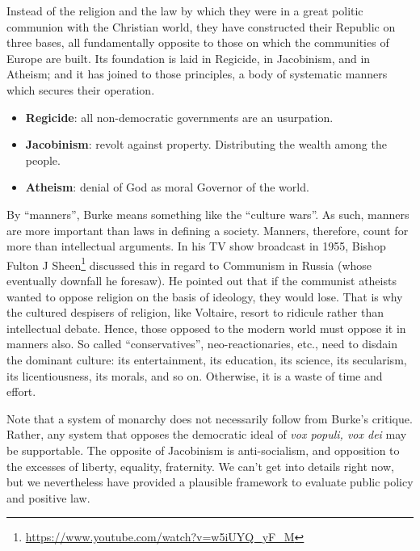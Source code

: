 \begin{quotex}
Instead of the religion and the law by which they were in a great politic communion with the Christian world, they have constructed their Republic on three bases, all fundamentally opposite to those on which the communities of Europe are built. Its foundation is laid in Regicide, in Jacobinism, and in Atheism; and it has joined to those principles, a body of systematic manners which secures their operation.
\end{quotex}


\begin{itemize}


\item \textbf{Regicide}: all non-democratic governments are an usurpation.

\item \textbf{Jacobinism}: revolt against property. Distributing the wealth among the people.

\item \textbf{Atheism}: denial of God as moral Governor of the world.

\end{itemize}


By ``manners'', Burke means something like the ``culture wars''. As such, manners are more important than laws in defining a society. Manners, therefore, count for more than intellectual arguments. In his TV show broadcast in 1955, Bishop Fulton J Sheen\footnote{\url{https://www.youtube.com/watch?v=w5iUYQ\_yF\_M}} discussed this in regard to Communism in Russia (whose eventually downfall he foresaw). He pointed out that if the communist atheists wanted to oppose religion on the basis of ideology, they would lose. That is why the cultured despisers of religion, like Voltaire, resort to ridicule rather than intellectual debate. Hence, those opposed to the modern world must oppose it in manners also. So called ``conservatives'', neo-reactionaries, etc., need to disdain the dominant culture: its entertainment, its education, its science, its secularism, its licentiousness, its morals, and so on. Otherwise, it is a waste of time and effort.

Note that a system of monarchy does not necessarily follow from Burke's critique. Rather, any system that opposes the democratic ideal of \emph{vox populi, vox dei} may be supportable. The opposite of Jacobinism is anti-socialism, and opposition to the excesses of liberty, equality, fraternity. We can't get into details right now, but we nevertheless have provided a plausible framework to evaluate public policy and positive law.

